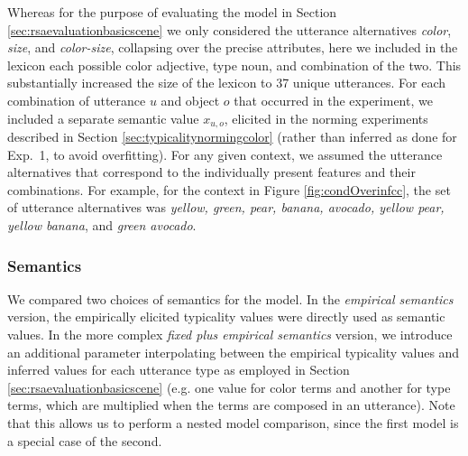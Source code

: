 \documentclass[11pt]{article}
\newcommand{\figref}[1]{Figure \ref{#1}}
\newcommand{\sectionref}[1]{Section \ref{#1}}
\begin{document}
Whereas for the purpose of evaluating the model in \sectionref{sec:rsaevaluationbasicscene}  we only considered the utterance alternatives \emph{color}, \emph{size}, and \emph{color-size}, collapsing over the precise attributes, here we included in the lexicon each possible color adjective, type noun, and combination of the two. This substantially increased the size of the lexicon to 37 unique utterances. For each combination of utterance $u$ and object $o$ that occurred in the experiment, we included a separate semantic value $x_{u,o}$, elicited in the norming experiments described in \sectionref{sec:typicalitynormingcolor} (rather than inferred as done for Exp.~1, to avoid overfitting).
For any given context, we assumed the utterance alternatives that correspond to the individually present features and their combinations. For example, for the context in \figref{fig:condOverinfcc}, the set of utterance alternatives was \emph{yellow, green, pear, banana, avocado, yellow pear, yellow banana}, and \emph{green avocado}. 

\subsubsection{Semantics}

We compared two choices of semantics for the model.
In the \emph{empirical semantics} version, the empirically elicited typicality values were directly used as semantic values.
In the more complex \emph{fixed plus empirical semantics} version, we introduce an additional parameter interpolating between the empirical typicality values and inferred values for each utterance type as  employed in \sectionref{sec:rsaevaluationbasicscene} (e.g. one value for color terms and another for type terms, which are multiplied when the terms are composed in an utterance).
Note that this allows us to perform a nested model comparison, since the first model is a special case of the second.
\end{document}

